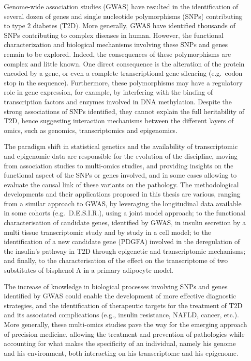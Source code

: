 \documentclass[11pt,a4paper,notrimn]{krantz}
\theoremstyle{definition}
\theoremstyle{definition}
\theoremstyle{remark}
\begin{document}
\normalsize Genome-wide association studies (GWAS) have
resulted in the identification of several dozen of genes and single
nucleotide polymorphisms (SNPs) contributing to type 2 diabetes (T2D).
More generally, GWAS have identified thousands of SNPs contributing to
complex diseases in human. However, the functional characterization and
biological mechanisms involving these SNPs and genes remain to be
explored. Indeed, the consequences of these polymorphisms are complex
and little known. One direct consequence is the alteration of the
protein encoded by a gene, or even a complete transcriptional gene
silencing (e.g.~codon stop in the sequence). Furthermore, these
polymorphisms may have a regulatory role in gene expression, for
example, by interfering with the binding of transcription factors and
enzymes involved in DNA methylation. Despite the strong associations of
SNPs identified, they cannot explain the full heritability of T2D, hence
suggesting interaction mechanisms between the different layers of omics,
such as genomics, transcriptomics and epigenomics.

The paradigm shift in statistical genetics and the availability of
transcriptomic and epigenomic data are responsible for the evolution of
the discipline, moving from association studies to multi-omics studies,
and providing insights on the functional aspect of the SNPs or genes
involved, and in some cases allowing to evaluate the causal link of
these variants on the pathology. The methodological developments and
their applications proposed in this thesis are various, ranging from a
similar approach to GWAS, by leveraging the longitudinal data available
in some cohorts (e.g.~D.E.S.I.R.), using a joint model approach; to the
functional characterisation of candidate genes, identified by GWAS, in
insulin secretion by a multi tissue transcriptomic study and by study in
a cell model; to the identification of a new candidate gene (PDGFA)
involved in the deregulation of the insulin's pathway in T2D through
epigenetic and transcriptomic mechanisms; and finally, to the
characterisation of the effect on the transcriptome of two substitutes
of bisphenol A in a primary adipocyte model.

The increase of knowledge in biological processes involving SNPs and
genes identified by GWAS could enable the development of more effective
diagnostic strategies, and the identification of therapeutic targets for
the treatment of T2D and its associated complications (e.g., insulin
resistance, NAFLD, cancer, etc.). More generally, these multi-omics
studies pave the way for the emerging approach of precision medicine,
allowing the treatment and prevention of pathologies while accounting
for what makes the specificity of an individual, namely his genome and
his environment, both interacting on his transcriptome and his
epigenome.
\end{document}
